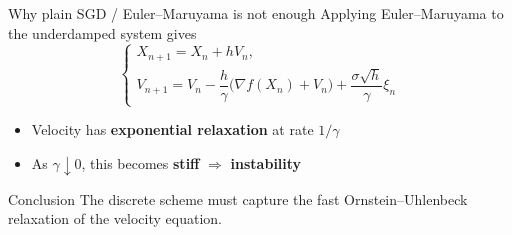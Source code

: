 \documentclass{beamer}
\newcommand{\<}{\langle}
\renewcommand{\>}{\rangle}
\begin{document}
\begin{frame}{Why plain SGD / Euler--Maruyama is not enough}
    Applying Euler--Maruyama to the underdamped system gives
    \[
    \begin{cases}
        X_{n+1}=X_n+hV_n,\\
        V_{n+1}=V_n-\dfrac{h}{\gamma}\bigl(\nabla f(X_n)+V_n\bigr)
        +\dfrac{\sigma\sqrt h}{\gamma}\xi_n
    \end{cases}
    \]
    \begin{itemize}
        \item Velocity has \textbf{exponential relaxation} at rate $1/\gamma$
        \item As $\gamma\downarrow 0$, this becomes \textbf{stiff} $\Rightarrow$ \textbf{instability}
    \end{itemize}
    \bigskip
    \begin{block}{Conclusion}
        The discrete scheme must capture the fast Ornstein--Uhlenbeck relaxation of the velocity equation.
    \end{block}
\end{frame}

\end{document}
